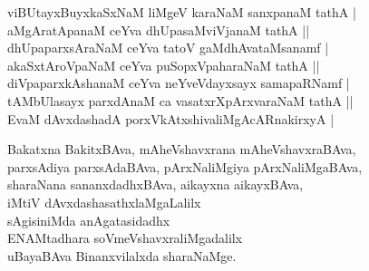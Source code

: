 \begin{entry}
\begin{shl}
viBUtayxBuyxkaSxNaM liMgeV karaNaM sanxpanaM tathA |\\
aMgAratApanaM ceYva dhUpasaMviVjanaM tathA ||\\
dhUpaparxsAraNaM ceYva tatoV gaMdhAvataMsanamf |\\
akaSxtAroVpaNaM ceYva puSopxVpaharaNaM tathA ||\\
diVpaparxkAshanaM ceYva neYveVdayxsayx samapaRNamf |\\
tAMbUlasayx parxdAnaM ca vasatxrXpArxvaraNaM tathA ||\\
EvaM dAvxdashadA porxVkAtxshivaliMgAcARnakirxyA |
\end{shl}
\end{entry}

\begin{entry}
\begin{shl}
Bakatxna BakitxBAva, mAheVshavxrana mAheVshavxraBAva,\\
parxsAdiya parxsAdaBAva, pArxNaliMgiya pArxNaliMgaBAva,\\
sharaNana sananxdadhxBAva, aikayxna aikayxBAva,\\
iMtiV dAvxdashasathxlaMgaLalilx\\
sAgisiniMda anAgatasidadhx\\
ENAMtadhara soVmeVshavxraliMgadalilx\\
uBayaBAva Binanxvilalxda sharaNaMge.
\end{shl}
\end{entry}

